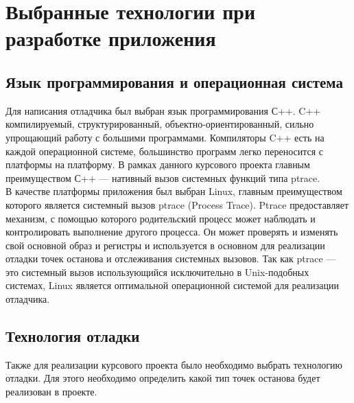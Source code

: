 \documentclass[a4paper,14pt,oneside]{extreport}  %
\begin{document}
\newpage
\chapter{Выбранные технологии при разработке приложения}
\section{Язык программирования и операционная система}
Для написания отладчика был выбран язык программирования С++.
C++ компилируемый, структурированный, объектно-ориентированный, сильно упрощающий работу с большими программами. Компиляторы C++ есть на каждой операционной системе, большинство программ легко переносится с платформы на платформу. В рамках данного курсового проекта главным преимуществом С++ — нативный вызов системных функций типа ptrace.\\

В качестве платформы приложения был выбран Linux, главным преимуществом которого является системный вызов ptrace (Process Trace). Ptrace предоставляет механизм, с помощью которого родительский процесс может наблюдать и контролировать выполнение другого процесса. Он может проверять и изменять свой основной образ и регистры и используется в основном для реализации отладки точек останова и отслеживания системных вызовов.
Так как ptrace — это системный вызов использующийся исключительно в Unix-подобных системах, Linux является оптимальной операционной системой для реализации отладчика.
\section{Технология отладки}
Также для реализации курсового проекта было необходимо выбрать технологию отладки. Для этого необходимо определить какой тип точек останова будет реализован в проекте.
\end{document}
